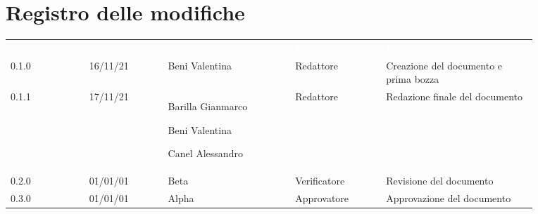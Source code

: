 \section*{Registro delle modifiche}

{\renewcommand{\arraystretch}{1.5}
\begin{tabular}{p{0.13\linewidth}p{0.13\linewidth}p{0.21\linewidth}p{0.15\linewidth}p{0.25\linewidth}}
	\rowcolor[RGB]{33, 73, 50}
	\textcolor{white}{\textbf{Versione}} & \textcolor{white}{\textbf{Data}} & \textcolor{white}
	{\textbf{Nominativo}} & \textcolor{white}{\textbf{Ruolo}} & \textcolor{white}
	{\textbf{Descrizione}}\\
	\rowcolor[RGB]{216, 235, 171}
	0.1.0 & 16/11/21 & Beni Valentina & Redattore & Creazione del documento e prima bozza\\
	\rowcolor[RGB]{233, 245, 206}
	0.1.1 & 17/11/21 & Barilla Gianmarco \par  Beni Valentina  \par Canel Alessandro & Redattore & Redazione finale del documento\\
	\rowcolor[RGB]{216, 235, 171}
	0.2.0 & 01/01/01 & Beta & Verificatore & Revisione del documento\\
	\rowcolor[RGB]{233, 245, 206}
	0.3.0 & 01/01/01 & Alpha & Approvatore & Approvazione del documento\\
	
\end{tabular}	
}